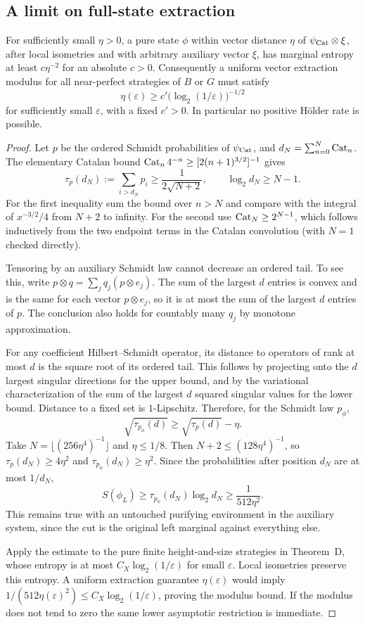 \subsection{A limit on full-state extraction}
\begin{proposition}\label{prop:modulus}
For sufficiently small $\eta>0$, a pure state $\phi$ within vector distance $\eta$ of $\psi_{\mathrm{Cat}}\otimes\xi$, after local isometries and with arbitrary auxiliary vector $\xi$, has marginal entropy at least $c\eta^{-2}$ for an absolute $c>0$. Consequently a uniform vector extraction modulus for all near-perfect strategies of $B$ or $G$ must satisfy
\[
 \eta(\varepsilon)\ge c'\bigl(\log_2(1/\varepsilon)\bigr)^{-1/2}
\]
for sufficiently small $\varepsilon$, with a fixed $c'>0$. In particular no positive H\"older rate is possible.
\end{proposition}
\begin{proof}
Let $p$ be the ordered Schmidt probabilities of $\psi_{\mathrm{Cat}}$, and $d_N=\sum_{n=0}^N\operatorname{Cat}_n$. The elementary Catalan bound $\operatorname{Cat}_n4^{-n}\ge[2(n+1)^{3/2}]^{-1}$ gives
\[
 \tau_p(d_N):=\sum_{i>d_N}p_i\ge\frac1{2\sqrt{N+2}},
 \qquad\log_2d_N\ge N-1.
\]
For the first inequality sum the bound over $n>N$ and compare with the integral of $x^{-3/2}/4$ from $N+2$ to infinity. For the second use $\operatorname{Cat}_N\ge2^{N-1}$, which follows inductively from the two endpoint terms in the Catalan convolution (with $N=1$ checked directly).

Tensoring by an auxiliary Schmidt law cannot decrease an ordered tail. To see this, write $p\otimes q=\sum_jq_j(p\otimes e_j)$. The sum of the largest $d$ entries is convex and is the same for each vector $p\otimes e_j$, so it is at most the sum of the largest $d$ entries of $p$. The conclusion also holds for countably many $q_j$ by monotone approximation.

For any coefficient Hilbert--Schmidt operator, its distance to operators of rank at most $d$ is the square root of its ordered tail. This follows by projecting onto the $d$ largest singular directions for the upper bound, and by the variational characterization of the sum of the largest $d$ squared singular values for the lower bound. Distance to a fixed set is $1$-Lipschitz. Therefore, for the Schmidt law $p_\phi$,
\[
 \sqrt{\tau_{p_\phi}(d)}\ge\sqrt{\tau_p(d)}-\eta.
\]
Take $N=\lfloor(256\eta^4)^{-1}\rfloor$ and $\eta\le1/8$. Then $N+2\le(128\eta^4)^{-1}$, so $\tau_p(d_N)\ge4\eta^2$ and $\tau_{p_\phi}(d_N)\ge\eta^2$. Since the probabilities after position $d_N$ are at most $1/d_N$,
\[
 S(\phi_L)\ge\tau_{p_\phi}(d_N)\log_2d_N
 \ge\frac1{512\eta^2}.
\]
This remains true with an untouched purifying environment in the auxiliary system, since the cut is the original left marginal against everything else.

Apply the estimate to the pure finite height-and-size strategies in Theorem~D, whose entropy is at most $C_X\log_2(1/\varepsilon)$ for small $\varepsilon$. Local isometries preserve this entropy. A uniform extraction guarantee $\eta(\varepsilon)$ would imply $1/(512\eta(\varepsilon)^2)\le C_X\log_2(1/\varepsilon)$, proving the modulus bound. If the modulus does not tend to zero the same lower asymptotic restriction is immediate.
\end{proof}
